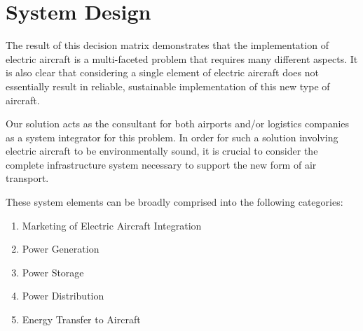 \documentclass[../main.tex]{subfiles}
\begin{document}
\begin{figure}[ht]
\end{figure}
\FloatBarrier
\section{System Design}
The result of this decision matrix demonstrates that the implementation of electric aircraft is a multi-faceted problem that requires many different aspects. It is also clear that considering a single element of electric aircraft does not essentially result in reliable, sustainable implementation of this new type of aircraft.\par
Our solution acts as the consultant for both airports and/or logistics companies as a system integrator for this problem. In order for such a solution involving electric aircraft to be environmentally sound, it is crucial to consider the complete infrastructure system necessary to support the new form of air transport.\par
These system elements can be broadly comprised into the following categories:
\begin{singlespace}
\begin{enumerate}
    \item Marketing of Electric Aircraft Integration
    \item Power Generation
    \item Power Storage
    \item Power Distribution
    \item Energy Transfer to Aircraft
\end{enumerate}
\end{singlespace}
\end{document}
